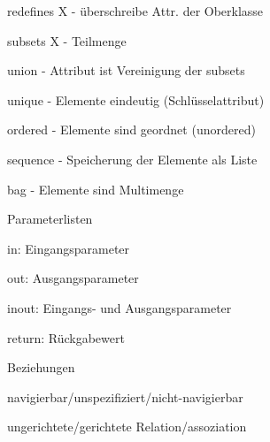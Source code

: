 \documentclass[a4paper]{article}
\begin{document}
\begin{multicols}{3}
\begin{itemize*}
\begin{itemize*}
      \item redefines X - überschreibe Attr. der Oberklasse
      \item subsets X - Teilmenge
      \item union - Attribut ist Vereinigung der subsets
      \item unique - Elemente eindeutig (Schlüsselattribut)
      \item ordered - Elemente sind geordnet (unordered)
      \item sequence - Speicherung der Elemente als Liste
      \item bag - Elemente sind Multimenge
    \end{itemize*}
    \item Parameterlisten
    \begin{itemize*}
      \item in: Eingangsparameter
      \item out: Ausgangsparameter
      \item inout: Eingangs- und Ausgangsparameter
      \item return: Rückgabewert
    \end{itemize*}
    \item Beziehungen
    \begin{itemize*}
      \item navigierbar/unspezifiziert/nicht-navigierbar
      \item ungerichtete/gerichtete Relation/assoziation
    \end{itemize*}
  \end{itemize*}


\end{multicols}
\end{document}
